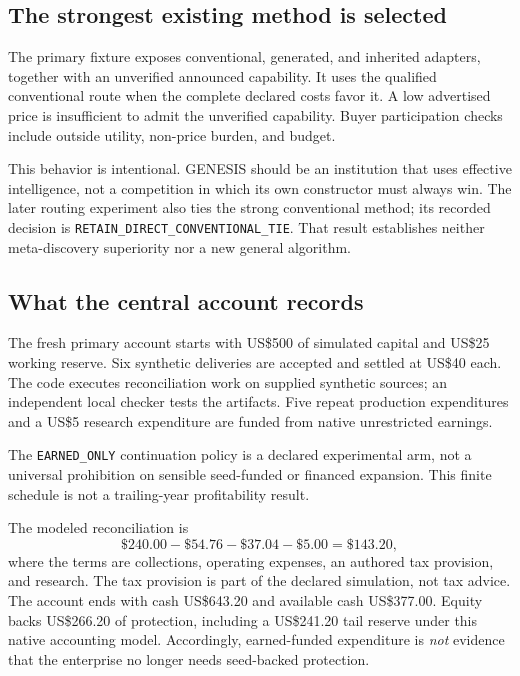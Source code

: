 \documentclass[11pt,letterpaper]{article}
\theoremstyle{remark}\newtheorem{remark}{Remark}[section]
\begin{document}
\subsection{The strongest existing method is selected}
The primary fixture exposes conventional, generated, and inherited adapters, together with an unverified announced capability. It uses the qualified conventional route when the complete declared costs favor it. A low advertised price is insufficient to admit the unverified capability. Buyer participation checks include outside utility, non-price burden, and budget.

This behavior is intentional. GENESIS should be an institution that uses effective intelligence, not a competition in which its own constructor must always win. The later routing experiment also ties the strong conventional method; its recorded decision is \texttt{RETAIN\_DIRECT\_CONVENTIONAL\_TIE}. That result establishes neither meta-discovery superiority nor a new general algorithm.

\subsection{What the central account records}
The fresh primary account starts with US\$500 of simulated capital and US\$25 working reserve. Six synthetic deliveries are accepted and settled at US\$40 each. The code executes reconciliation work on supplied synthetic sources; an independent local checker tests the artifacts. Five repeat production expenditures and a US\$5 research expenditure are funded from native unrestricted earnings.

The \texttt{EARNED\_ONLY} continuation policy is a declared experimental arm, not a universal prohibition on sensible seed-funded or financed expansion. This finite schedule is not a trailing-year profitability result.

The modeled reconciliation is
\begin{equation}
\$240.00-\$54.76-\$37.04-\$5.00=\$143.20,
\label{eq:native}
\end{equation}
where the terms are collections, operating expenses, an authored tax provision, and research. The tax provision is part of the declared simulation, not tax advice. The account ends with cash US\$643.20 and available cash US\$377.00. Equity backs US\$266.20 of protection, including a US\$241.20 tail reserve under this native accounting model. Accordingly, earned-funded expenditure is \emph{not} evidence that the enterprise no longer needs seed-backed protection.
\end{document}
